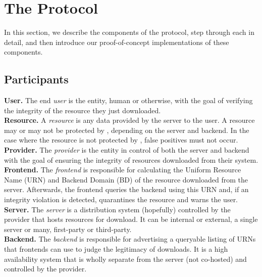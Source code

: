 \section{The \SYSTEM{} Protocol} \label{sec:approach}

In this section, we describe the components of the \SYSTEM{} protocol, step
through each in detail, and then introduce our proof-of-concept implementations
of these components.


\subsection{Participants}

\noindent\textbf{User.} The end \emph{user} is the entity, human or otherwise,
with the goal of verifying the integrity of the resource they just downloaded.
\\

\noindent\textbf{Resource.} A \emph{resource} is any data provided by the server
to the user. A resource may or may not be protected by \SYSTEM{}, depending on
the server and backend. In the case where the resource is not protected by
\SYSTEM{}, false positives must not occur. \\

\noindent\textbf{Provider.} The \emph{provider} is the entity in control of both
the server and backend with the goal of ensuring the integrity of resources
downloaded from their system. \\

\noindent\textbf{\SYSTEM{} Frontend.} The \emph{frontend} is responsible for
calculating the Uniform Resource Name (URN) and Backend Domain (BD) of the
resource downloaded from the server. Afterwards, the frontend queries the
backend using this URN and, if an integrity violation is detected, quarantines
the resource and warns the user. \\

\noindent\textbf{Server.} The \emph{server} is a distribution system (hopefully)
controlled by the provider that hosts resources for download. It can be internal
or external, a single server or many, first-party or third-party. \\

\noindent\textbf{\SYSTEM{} Backend.} The \emph{backend} is responsible for
advertising a queryable listing of URNs that \SYSTEM{} frontends can use to
judge the legitimacy of downloads. It is a high availability system that is
wholly separate from the server (not co-hosted) and controlled by the provider.

